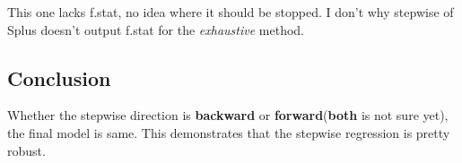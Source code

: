 \documentclass[a4paper,10pt]{article}
\begin{document}
This one lacks f.stat, no idea where it should be stopped. I don't why stepwise of Splus doesn't output f.stat for the \emph{exhaustive} method.

\subsection{Conclusion}
Whether the stepwise direction is \textbf{backward} or \textbf{forward}(\textbf{both} is not sure yet), the final model is same. This demonstrates that the stepwise regression is pretty robust.
\end{document}
